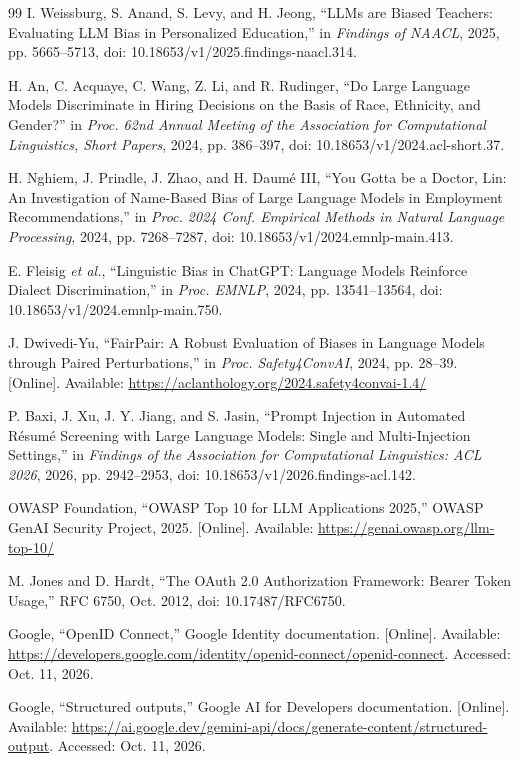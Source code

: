 \documentclass[conference]{IEEEtran}
\begin{document}
\begin{thebibliography}{99}
I. Weissburg, S. Anand, S. Levy, and H. Jeong,
``LLMs are Biased Teachers: Evaluating LLM Bias in Personalized Education,'' in \emph{Findings of NAACL}, 2025, pp. 5665--5713, doi: 10.18653/v1/2025.findings-naacl.314.

H. An, C. Acquaye, C. Wang, Z. Li, and R. Rudinger,
``Do Large Language Models Discriminate in Hiring Decisions on the Basis of Race, Ethnicity, and Gender?''
in \emph{Proc. 62nd Annual Meeting of the Association for Computational Linguistics, Short Papers}, 2024, pp. 386--397, doi: 10.18653/v1/2024.acl-short.37.

H. Nghiem, J. Prindle, J. Zhao, and H. Daum\'{e} III,
``You Gotta be a Doctor, Lin: An Investigation of Name-Based Bias of Large Language Models in Employment Recommendations,''
in \emph{Proc. 2024 Conf. Empirical Methods in Natural Language Processing}, 2024, pp. 7268--7287, doi: 10.18653/v1/2024.emnlp-main.413.

E. Fleisig \emph{et al.}, ``Linguistic Bias in ChatGPT: Language Models Reinforce Dialect Discrimination,'' in \emph{Proc. EMNLP}, 2024, pp. 13541--13564, doi: 10.18653/v1/2024.emnlp-main.750.

J. Dwivedi-Yu,
``FairPair: A Robust Evaluation of Biases in Language Models through Paired Perturbations,'' in \emph{Proc. Safety4ConvAI}, 2024, pp. 28--39. [Online]. Available: \url{https://aclanthology.org/2024.safety4convai-1.4/}

P. Baxi, J. Xu, J. Y. Jiang, and S. Jasin,
``Prompt Injection in Automated R\'{e}sum\'{e} Screening with Large Language Models: Single and Multi-Injection Settings,''
in \emph{Findings of the Association for Computational Linguistics: ACL 2026}, 2026, pp. 2942--2953, doi: 10.18653/v1/2026.findings-acl.142.

OWASP Foundation,
``OWASP Top 10 for LLM Applications 2025,''
OWASP GenAI Security Project, 2025. [Online]. Available: \url{https://genai.owasp.org/llm-top-10/}

M. Jones and D. Hardt,
``The OAuth 2.0 Authorization Framework: Bearer Token Usage,'' RFC 6750, Oct. 2012, doi: 10.17487/RFC6750.

Google,
``OpenID Connect,''
Google Identity documentation. [Online]. Available: \url{https://developers.google.com/identity/openid-connect/openid-connect}. Accessed: Oct. 11, 2026.

Google,
``Structured outputs,''
Google AI for Developers documentation. [Online]. Available:
\url{https://ai.google.dev/gemini-api/docs/generate-content/structured-output}.
Accessed: Oct. 11, 2026.

\end{thebibliography}
\end{document}
